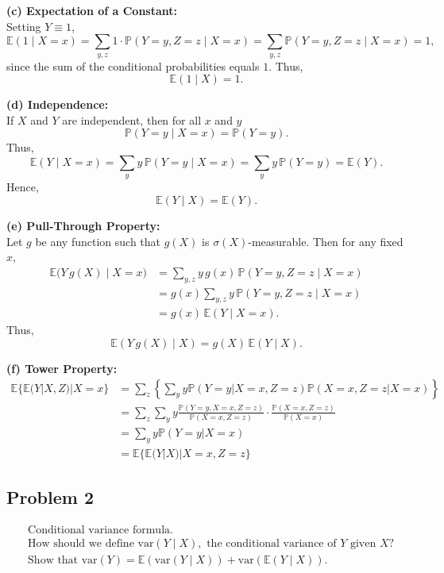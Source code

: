 \documentclass[letterpaper, 11pt]{article}
\newcommand{\1}{\mathds{1}}	%
\theoremstyle{definition}
\begin{document}
    \bigskip
    
    \textbf{(c) Expectation of a Constant:}\\[1ex]
    Setting \(Y\equiv 1\),
    \[
    \mathbb{E}(1 \mid X=x)= \sum_{y,z} 1\cdot \mathbb{P}(Y=y, Z=z \mid X=x)
    =\sum_{y,z} \mathbb{P}(Y=y, Z=z \mid X=x)=1,
    \]
    since the sum of the conditional probabilities equals \(1\). Thus,
    \[
    {\mathbb{E}(1 \mid X) = 1.}
    \]
    
    \bigskip
    
    \textbf{(d) Independence:}\\[1ex]
    If \(X\) and \(Y\) are independent, then for all \(x\) and \(y\)
    \[
    \mathbb{P}(Y=y \mid X=x)=\mathbb{P}(Y=y).
    \]
    Thus,
    \[
    \mathbb{E}(Y \mid X=x)= \sum_{y} y\, \mathbb{P}(Y=y \mid X=x)
    =\sum_{y} y\, \mathbb{P}(Y=y)= \mathbb{E}(Y).
    \]
    Hence,
    \[
 {\mathbb{E}(Y \mid X) = \mathbb{E}(Y).}
    \]
    
    \bigskip
    
    \textbf{(e) Pull-Through Property:}\\[1ex]
    Let \(g\) be any function such that \(g(X)\) is \(\sigma(X)\)-measurable. Then for any fixed \(x\),
    \[
    \begin{aligned}
    \mathbb{E}\bigl(Y\,g(X) \mid X=x\bigr)
    &=\sum_{y,z} y\,g(x)\,\mathbb{P}(Y=y, Z=z \mid X=x)\\[1ex]
    &= g(x) \sum_{y,z} y\, \mathbb{P}(Y=y, Z=z \mid X=x)\\[1ex]
    &= g(x)\,\mathbb{E}(Y \mid X=x).
    \end{aligned}
    \]
    Thus,
    \[
  {\mathbb{E}(Y\,g(X) \mid X)= g(X)\,\mathbb{E}(Y \mid X).}
    \]
    
    \bigskip
    
    \textbf{(f) Tower Property:}\begin{align*}
        \mathbb{E}\{\mathbb{E}(Y | X, Z) | X = x\} &= \sum_{z} \left\{ \sum_{y} y\mathbb{P}(Y = y | X = x, Z = z)\mathbb{P}(X = x, Z = z | X = x) \right\} \\
        &= \sum_{z}\sum_{y} y\frac{\mathbb{P}(Y = y, X = x, Z = z)}{\mathbb{P}(X = x, Z = z)} \cdot \frac{\mathbb{P}(X = x, Z = z)}{\mathbb{P}(X = x)} \\
        &= \sum_{y} y\mathbb{P}(Y = y | X = x)  \\
        &= \mathbb{E}\{\mathbb{E}(Y | X) | X = x, Z = z\}
        \end{align*}
    
\subsection*{Problem 2}
\begin{align*}
    &\text{Conditional variance formula.} \\
    &\text{How should we define var}(Y \mid X), \text{ the conditional variance of } Y \text{ given } X\text{?} \\
    &\text{Show that var}(Y) = \mathbb{E}(\text{var}(Y \mid X)) + \text{var}(\mathbb{E}(Y \mid X)).
    \end{align*}
\end{document}
